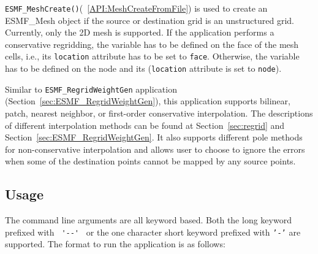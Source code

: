 {\tt ESMF\_MeshCreate()}(~\ref{API:MeshCreateFromFile}) is used to create an ESMF\_Mesh object if the
source or destination grid is an unstructured grid. Currently, only the 2D mesh is supported.
If the application performs a conservative regridding, the variable has to be defined on the face of the mesh cells, i.e., its {\tt location} attribute has to be set to {\tt face}.  Otherwise, the variable has to be 
defined on the node and its ({\tt location} attribute is set to {\tt node}).

Similar to {\tt ESMF\_RegridWeightGen} application (Section~\ref{sec:ESMF_RegridWeightGen}), this application supports
bilinear, patch, nearest neighbor, or first-order conservative interpolation. The descriptions of different 
interpolation methods can be found at Section~\ref{sec:regrid} and Section~\ref{sec:ESMF_RegridWeightGen}. 
It also supports different pole methods for non-conservative interpolation and allows user to choose to 
ignore the errors when some of the destination points cannot be mapped by any source points. 

\subsection{Usage}\label{sec:fileregridusage}

The command line arguments are all keyword based.  Both the long keyword prefixed with \verb+ '--' + or the
one character short keyword prefixed with {\tt '-'} are supported.  The format to run the application is
as follows:

